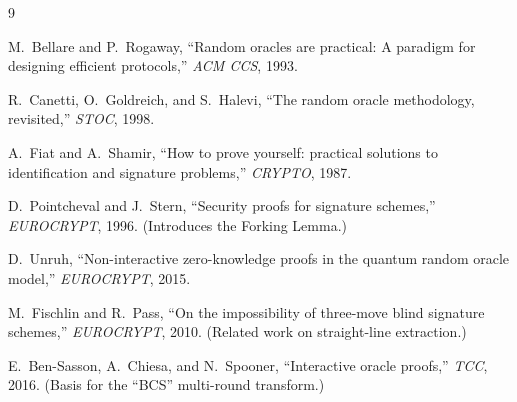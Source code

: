 \documentclass[11pt]{article}
\begin{document}
\begin{thebibliography}{9}

  M.~Bellare and P.~Rogaway,
  ``Random oracles are practical: A paradigm for designing efficient
  protocols,''
  \emph{ACM CCS}, 1993.

  R.~Canetti, O.~Goldreich, and S.~Halevi,
  ``The random oracle methodology, revisited,''
  \emph{STOC}, 1998.

  A.~Fiat and A.~Shamir,
  ``How to prove yourself: practical solutions to identification and
  signature problems,''
  \emph{CRYPTO}, 1987.

  D.~Pointcheval and J.~Stern,
  ``Security proofs for signature schemes,''
  \emph{EUROCRYPT}, 1996.
  (Introduces the Forking Lemma.)

  D.~Unruh,
  ``Non-interactive zero-knowledge proofs in the quantum random oracle
  model,''
  \emph{EUROCRYPT}, 2015.

  M.~Fischlin and R.~Pass,
  ``On the impossibility of three-move blind signature schemes,''
  \emph{EUROCRYPT}, 2010.
  (Related work on straight-line extraction.)

  E.~Ben-Sasson, A.~Chiesa, and N.~Spooner,
  ``Interactive oracle proofs,''
  \emph{TCC}, 2016.
  (Basis for the ``BCS'' multi-round transform.)

\end{thebibliography}
\end{document}
